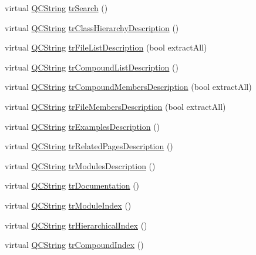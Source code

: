 \begin{DoxyCompactItemize}
\item 
virtual \hyperlink{class_q_c_string}{Q\-C\-String} \hyperlink{class_translator_catalan_a6a284cb12ea8d274211aa42dad4654c4}{tr\-Search} ()
\item 
virtual \hyperlink{class_q_c_string}{Q\-C\-String} \hyperlink{class_translator_catalan_a7697957dd30cb62ae6635bdd99b828b3}{tr\-Class\-Hierarchy\-Description} ()
\item 
virtual \hyperlink{class_q_c_string}{Q\-C\-String} \hyperlink{class_translator_catalan_adca38ddeb72745fe24c61ff08af9e6c4}{tr\-File\-List\-Description} (bool extract\-All)
\item 
virtual \hyperlink{class_q_c_string}{Q\-C\-String} \hyperlink{class_translator_catalan_af008bc8cb43ee14946b1671d80099a34}{tr\-Compound\-List\-Description} ()
\item 
virtual \hyperlink{class_q_c_string}{Q\-C\-String} \hyperlink{class_translator_catalan_ab5fb09f47fa021d41e036d9f41bf741a}{tr\-Compound\-Members\-Description} (bool extract\-All)
\item 
virtual \hyperlink{class_q_c_string}{Q\-C\-String} \hyperlink{class_translator_catalan_a209311e74b83f8ac8eba8581d8a89eb9}{tr\-File\-Members\-Description} (bool extract\-All)
\item 
virtual \hyperlink{class_q_c_string}{Q\-C\-String} \hyperlink{class_translator_catalan_a0085d1262f19b68fdad2ad542f24914e}{tr\-Examples\-Description} ()
\item 
virtual \hyperlink{class_q_c_string}{Q\-C\-String} \hyperlink{class_translator_catalan_a9343c5fac5dbcf77ba7c31a80cb74846}{tr\-Related\-Pages\-Description} ()
\item 
virtual \hyperlink{class_q_c_string}{Q\-C\-String} \hyperlink{class_translator_catalan_aafdd368977a57dc31d200e624a1358ac}{tr\-Modules\-Description} ()
\item 
virtual \hyperlink{class_q_c_string}{Q\-C\-String} \hyperlink{class_translator_catalan_abde5870e18c641cdd9104c08a5cb42e7}{tr\-Documentation} ()
\item 
virtual \hyperlink{class_q_c_string}{Q\-C\-String} \hyperlink{class_translator_catalan_ac13cd71aaccdf563fb4b51179c6c3254}{tr\-Module\-Index} ()
\item 
virtual \hyperlink{class_q_c_string}{Q\-C\-String} \hyperlink{class_translator_catalan_af0fb797c11c9aaa2f584997c3b19efb6}{tr\-Hierarchical\-Index} ()
\item 
virtual \hyperlink{class_q_c_string}{Q\-C\-String} \hyperlink{class_translator_catalan_a0d67faac0c6d3dec493e01e0076a3425}{tr\-Compound\-Index} ()

\end{DoxyCompactItemize}
